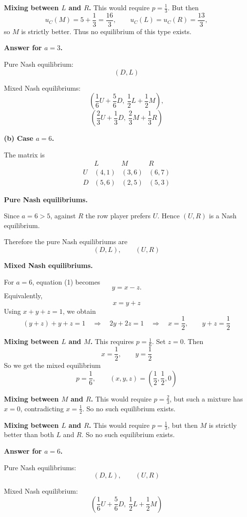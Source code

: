\textbf{Mixing between \(L\) and \(R\).}
This would require \(p=\frac13\). But then
\[
u_C(M)=5+\frac13=\frac{16}{3},
\qquad
u_C(L)=u_C(R)=\frac{13}{3},
\]
so \(M\) is strictly better. Thus no equilibrium of this type exists.

\textbf{Answer for \(a=3\).}

Pure Nash equilibrium:
\[
(D,L)
\]

Mixed Nash equilibriums:
\[
\left(\frac16 U+\frac56 D,\ \frac12 L+\frac12 M\right),
\]
\[
\left(\frac23 U+\frac13 D,\ \frac23 M+\frac13 R\right)
\]

\textbf{(b) Case \(a=6\).}

The matrix is
\[
\begin{array}{c|ccc}
 & L & M & R\\
\hline
U & (4,1) & (3,6) & (6,7)\\
D & (5,6) & (2,5) & (5,3)
\end{array}
\]

\textbf{Pure Nash equilibriums.}

Since \(a=6>5\), against \(R\) the row player prefers \(U\). Hence \((U,R)\) is a Nash equilibrium.

Therefore the pure Nash equilibriums are
\[
(D,L),\qquad (U,R)
\]

\textbf{Mixed Nash equilibriums.}

For \(a=6\), equation (1) becomes
\[
y=x-z. \tag{3}
\]
Equivalently,
\[
x=y+z
\]
Using \(x+y+z=1\), we obtain
\[
(y+z)+y+z=1
\quad\Rightarrow\quad
2y+2z=1
\quad\Rightarrow\quad
x=\frac12,\qquad y+z=\frac12
\]

\textbf{Mixing between \(L\) and \(M\).}
This requires \(p=\frac16\). Set \(z=0\). Then
\[
x=\frac12,\qquad y=\frac12
\]
So we get the mixed equilibrium
\[
p=\frac16,\qquad (x,y,z)=\left(\frac12,\frac12,0\right)
\]

\textbf{Mixing between \(M\) and \(R\).}
This would require \(p=\frac23\), but such a mixture has \(x=0\), contradicting \(x=\frac12\). So no such equilibrium exists.

\textbf{Mixing between \(L\) and \(R\).}
This would require \(p=\frac13\), but then \(M\) is strictly better than both \(L\) and \(R\). So no such equilibrium exists.

\textbf{Answer for \(a=6\).}

Pure Nash equilibriums:
\[
(D,L),\qquad (U,R)
\]

Mixed Nash equilibrium:
\[
\left(\frac16 U+\frac56 D,\ \frac12 L+\frac12 M\right)
\]

